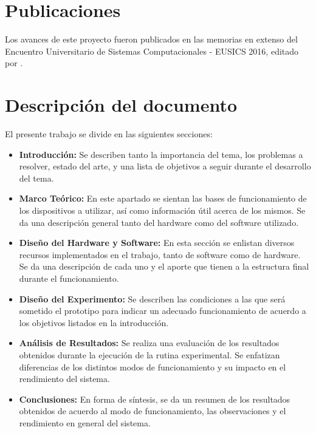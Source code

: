 \section{Publicaciones}

Los avances de este proyecto fueron publicados en las memorias en extenso del Encuentro Universitario de Sistemas Computacionales - EUSICS 2016, editado por \citet{eusics}.

\section{Descripción del documento}

El presente trabajo se divide en las siguientes secciones: 

\begin{itemize}
\item \textbf{Introducción:} Se describen tanto la importancia del tema, los problemas a resolver, estado del arte, y una lista de objetivos a seguir durante el desarrollo del tema.\\
\item \textbf{Marco Teórico:} En este apartado se sientan las bases de funcionamiento de los dispositivos a utilizar, así como información útil acerca de los mismos. Se da una descripción general tanto del hardware como del software utilizado.\\
\item \textbf{Diseño del Hardware y Software:} En esta sección se enlistan diversos recursos implementados en el trabajo, tanto de software como de hardware. Se da una descripción de cada uno y el aporte que tienen a la estructura final durante el funcionamiento.\\
\item \textbf{Diseño del Experimento:} Se describen las condiciones a las que será sometido el prototipo para indicar un adecuado funcionamiento de acuerdo a los objetivos listados en la introducción.\\
\item \textbf{Análisis de Resultados:} Se realiza una evaluación de los resultados obtenidos durante la ejecución de la rutina experimental. Se enfatizan diferencias de los distintos modos de funcionamiento y su impacto en el rendimiento del sistema.\\
\item \textbf{Conclusiones:} En forma de síntesis, se da un resumen de los resultados obtenidos de acuerdo al modo de funcionamiento, las observaciones  y el rendimiento en general del sistema.\\
\end{itemize}

